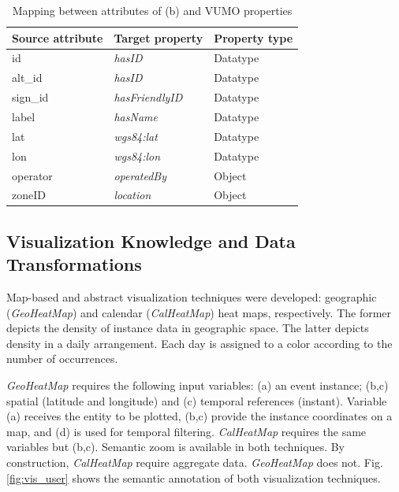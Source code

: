 \documentclass[]{interact}
\theoremstyle{plain}%
\theoremstyle{definition}
\theoremstyle{remark}
\theoremstyle{definition}
\begin{document}
\begin{table}[ht!]
\caption{Mapping between attributes of (b) and VUMO properties}
\label{tab:correspondence}
\centering
\begin{tabular}{lll}
    \hline
    \hline
    Source attribute & Target property & Property type\\
    \hline

	id & \textit{hasID} & Datatype\\
	alt\_id & \textit{hasID} & Datatype\\
	sign\_id & \textit{hasFriendlyID} & Datatype\\
	label & \textit{hasName} & Datatype\\
	lat & \textit{wgs84:lat} & Datatype\\
	lon & \textit{wgs84:lon} & Datatype\\
	operator & \textit{operatedBy} & Object\\
	zoneID & \textit{location} & Object \\
    \hline
    \hline
\end{tabular}
\end{table}


\subsection{Visualization Knowledge and Data Transformations}

Map-based and abstract visualization techniques were developed: geographic (\textit{GeoHeatMap}) and calendar (\textit{CalHeatMap}) heat maps, respectively. The former depicts the density of instance data in geographic space. The latter depicts density in a daily arrangement. Each day is assigned to a color according to the number of occurrences.

\textit{GeoHeatMap} requires the following input variables: (a) an event instance; (b,c) spatial (latitude and longitude) and (c) temporal references (instant). Variable (a) receives the entity to be plotted, (b,c) provide the instance coordinates on a map, and (d) is used for temporal filtering. \textit{CalHeatMap} requires the same variables but (b,c). Semantic zoom is available in both techniques. By construction, \textit{CalHeatMap} require aggregate data. \textit{GeoHeatMap} does not. Fig. \ref{fig:vis_user} shows the semantic annotation of both visualization techniques.
\end{document}
